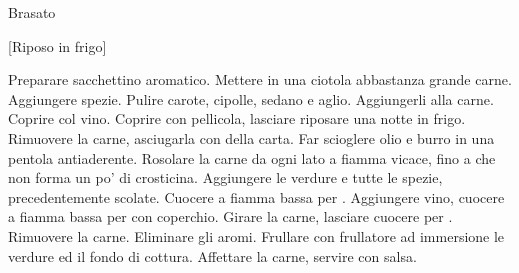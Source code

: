 \begin{recipe}{Brasato}
    \begin{header}

        [Riposo in frigo]
    \end{header}

    \begin{ingredients}[20]
        
        
        
    \end{ingredients}
    
    \begin{preparation}
        \step Preparare sacchettino aromatico.
        \step Mettere in una ciotola abbastanza grande carne.
        \step Aggiungere spezie.
        \step Pulire carote, cipolle, sedano e aglio. Aggiungerli alla carne.
        \step Coprire col vino.
        \step Coprire con pellicola, lasciare riposare una notte in frigo.
        \step Rimuovere la carne, asciugarla con della carta.
        \step Far scioglere olio e burro in una pentola antiaderente.
        \step Rosolare la carne da ogni lato a fiamma vicace, fino a che non forma un po' di crosticina.
        \step Aggiungere le verdure e tutte le spezie, precedentemente scolate.
        \step Cuocere a fiamma bassa per .
        \step Aggiungere vino, cuocere a fiamma bassa per  con coperchio.
        \step Girare la carne, lasciare cuocere per .
        \step Rimuovere la carne.
        \step Eliminare gli aromi.
        \step Frullare con frullatore ad immersione le verdure ed il fondo di cottura.
        \step Affettare la carne, servire con salsa.
    \end{preparation}
\end{recipe}
